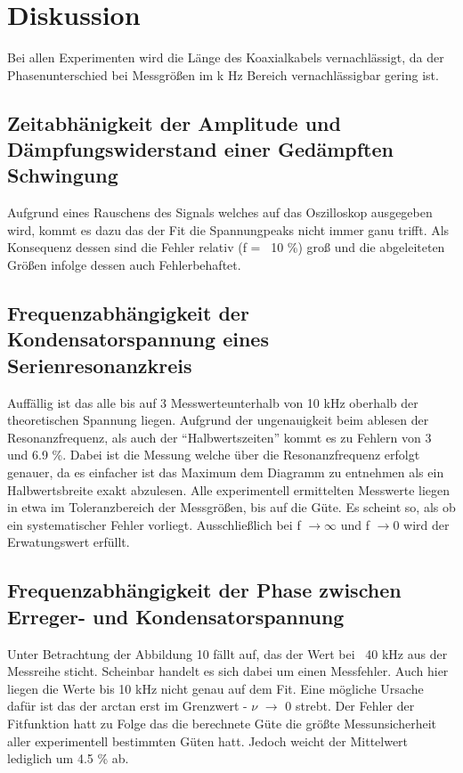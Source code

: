 \section{Diskussion}
\label{sec:Diskussion}
Bei allen Experimenten wird die Länge des Koaxialkabels vernachlässigt, da der Phasenunterschied bei Messgrößen im k Hz Bereich vernachlässigbar gering ist.
\subsection{Zeitabhänigkeit der Amplitude und Dämpfungswiderstand einer Gedämpften Schwingung}
Aufgrund eines Rauschens des Signals welches auf das Oszilloskop ausgegeben wird, kommt es dazu das der Fit die Spannungpeaks nicht immer ganu trifft. Als Konsequenz dessen sind die Fehler relativ (f =  ~10 \%) groß und die abgeleiteten Größen infolge dessen auch Fehlerbehaftet.
\subsection{Frequenzabhängigkeit der Kondensatorspannung eines
Serienresonanzkreis}
Auffällig ist das alle bis auf 3 Messwerteunterhalb von 10 kHz oberhalb der theoretischen Spannung liegen. Aufgrund der ungenauigkeit beim ablesen der Resonanzfrequenz, als auch der ``Halbwertszeiten'' kommt es zu Fehlern von 3 und 6.9 \%. Dabei ist die Messung welche über die Resonanzfrequenz erfolgt genauer, da es einfacher ist das Maximum dem Diagramm zu entnehmen als ein Halbwertsbreite exakt abzulesen. 
Alle experimentell ermittelten Messwerte liegen in etwa im Toleranzbereich der Messgrößen, bis auf die Güte. Es scheint so, als ob ein systematischer Fehler vorliegt. Ausschließlich bei f $\rightarrow \infty $ und f $\rightarrow 0$ wird der Erwatungswert erfüllt.
\subsection{Frequenzabhängigkeit der Phase zwischen Erreger- und
Kondensatorspannung}
Unter Betrachtung der Abbildung 10 fällt auf, das der Wert bei ~40 kHz aus der Messreihe sticht. Scheinbar handelt es sich dabei um einen Messfehler. Auch hier liegen die Werte bis 10 kHz nicht genau auf dem Fit. Eine  mögliche Ursache dafür ist das der arctan erst im Grenzwert - $\nu$ $\rightarrow$ 0 strebt. Der Fehler der Fitfunktion hatt zu Folge das die berechnete Güte die größte Messunsicherheit aller experimentell bestimmten Güten hatt. Jedoch weicht der Mittelwert lediglich um 4.5 \% ab. 
